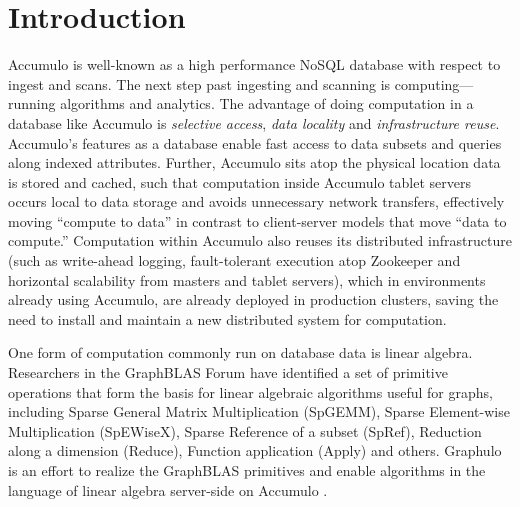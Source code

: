 
\section{Introduction}
\label{sIntro}
% 

Accumulo is well-known as a high performance NoSQL database with respect to ingest and scans.
The next step past ingesting and scanning is computing---running algorithms and analytics.
The advantage of doing computation in a database like Accumulo %
is \emph{selective access}, \emph{data locality} and \emph{infrastructure reuse}.
Accumulo's features as a database enable fast access to data subsets and queries along indexed attributes.
Further, Accumulo sits atop the physical location data is stored and cached, such that computation inside
Accumulo tablet servers occurs local to data storage and avoids unnecessary network transfers,
effectively moving ``compute to data'' in contrast to client-server models that move ``data to compute.''
Computation within Accumulo also reuses its distributed infrastructure
(such as write-ahead logging, fault-tolerant execution atop Zookeeper and 
horizontal scalability from masters and tablet servers), 
which in environments already using Accumulo, are already deployed in production clusters,
saving the need to install and maintain a new distributed system for computation.

One form of computation commonly run on database data is linear algebra.
Researchers in the GraphBLAS Forum \cite{x} have identified a set of primitive operations 
that form the basis for linear algebraic algorithms useful for graphs, including 
Sparse General Matrix Multiplication (SpGEMM),  Sparse Element-wise Multiplication (SpEWiseX),
Sparse Reference of a subset (SpRef), Reduction along a dimension (Reduce),
Function application (Apply) and others.
Graphulo is an effort to realize the GraphBLAS primitives 
and enable algorithms in the language of linear algebra server-side on Accumulo \cite{x}.


